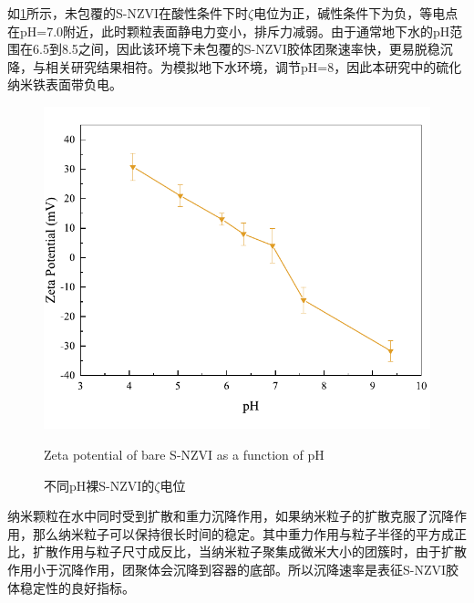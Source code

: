 


如\cref{fig3}所示，未包覆的S-NZVI在酸性条件下时$\zeta$电位为正，碱性条件下为负，等电点在pH=7.0附近，此时颗粒表面静电力变小，排斥力减弱。由于通常地下水的pH范围在6.5到8.5之间\cite{dixiashuibiaozhun}，因此该环境下未包覆的S-NZVI胶体团聚速率快，更易脱稳沉降，与相关研究结果相符。为模拟地下水环境，调节pH=8，因此本研究中的硫化纳米铁表面带负电。

\begin{figure}[h]
    \centering
    \includegraphics[width=12cm]{figs/fig3.pdf}
    \caption{不同pH裸S-NZVI的$\zeta$电位}{Zeta potential of bare S-NZVI as a function of pH}\label{fig3}
\end{figure}


纳米颗粒在水中同时受到扩散和重力沉降作用，如果纳米粒子的扩散克服了沉降作用，那么纳米粒子可以保持很长时间的稳定。其中重力作用与粒子半径的平方成正比，扩散作用与粒子尺寸成反比，当纳米粒子聚集成微米大小的团簇时，由于扩散作用小于沉降作用，团聚体会沉降到容器的底部。所以沉降速率是表征S-NZVI胶体稳定性的良好指标。

